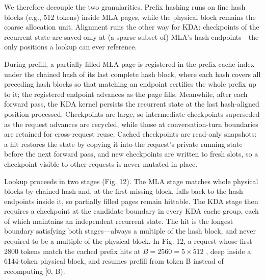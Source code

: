 \documentclass[
  10
]{article}
\begin{document}
We therefore decouple the two granularities. Prefix hashing runs on fine
hash blocks (e.g., 512 tokens) inside MLA pages, while the physical
block remains the coarse allocation unit. Alignment runs the other way
for KDA: checkpoints of the recurrent state are saved only at (a sparse
subset of) MLA's hash endpoints---the only positions a lookup can ever
reference.

During prefill, a partially filled MLA page is registered in the
prefix-cache index under the chained hash of its last complete hash
block, where each hash covers all preceding hash blocks so that matching
an endpoint certifies the whole prefix up to it; the registered endpoint
advances as the page fills. Meanwhile, after each forward pass, the KDA
kernel persists the recurrent state at the last hash-aligned position
processed. Checkpoints are large, so intermediate checkpoints superseded
as the request advances are recycled, while those at conversation-turn
boundaries are retained for cross-request reuse. Cached checkpoints are
read-only snapshots: a hit restores the state by copying it into the
request's private running state before the next forward pass, and new
checkpoints are written to fresh slots, so a checkpoint visible to other
requests is never mutated in place.

Lookup proceeds in two stages (Fig. 12). The MLA stage matches whole
physical blocks by chained hash and, at the first missing block, falls
back to the hash endpoints inside it, so partially filled pages remain
hittable. The KDA stage then requires a checkpoint at the candidate
boundary in every KDA cache group, each of which maintains an
independent recurrent state. The hit is the longest boundary satisfying
both stages---always a multiple of the hash block, and never required to
be a multiple of the physical block. In Fig. 12, a request whose first
2800 tokens match the cached prefix hits at
\(\dot { B } = 2 5 6 0 = 5 \times \dot { 5 } 1 2\) , deep inside a
6144-token physical block, and resumes prefill from token B instead of
recomputing {[}0, B).
\end{document}
